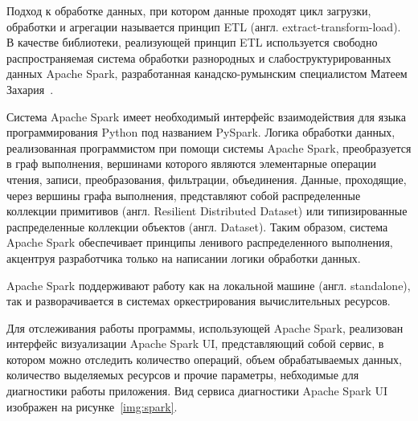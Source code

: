 Подход к обработке данных, при котором данные проходят цикл загрузки, обработки и агрегации называется принцип ETL 
(англ. extract-transform-load). В качестве библиотеки, реализующей принцип ETL используется свободно распространяемая
система обработки разнородных и слабоструктурированных данных Apache Spark, разработанная канадско-румынским специалистом
Матеем Захария~\autocite{impl:spark}.

Система Apache Spark имеет необходимый интерфейс взаимодействия для языка программирования Python под названием PySpark.
Логика обработки данных, реализованная программистом при помощи системы Apache Spark, преобразуется в граф выполнения,
вершинами которого являются элементарные операции чтения, записи, преобразования, фильтрации, объединения. 
Данные, проходящие, через вершины графа выполнения, представляют собой распределенные коллекции примитивов (англ. Resilient
Distributed Dataset) или типизированные распределенные коллекции объектов (англ. Dataset). Таким образом, система
Apache Spark обеспечивает принципы ленивого распределенного выполнения, акцентруя разработчика только на написании
логики обработки данных.

Apache Spark поддерживают работу как на локальной машине (англ. standalone), так и разворачивается в системах
оркестрирования вычислительных ресурсов.

Для отслеживания работы программы, использующей Apache Spark, реализован интерфейс визуализации  Apache Spark UI, 
представляющий собой сервис, в котором можно отследить количество операций, объем обрабатываемых данных, количество
выделяемых ресурсов и прочие параметры, небходимые для диагностики работы приложения. Вид сервиса диагностики Apache
Spark UI изображен на рисунке~\ref{img:spark}.
